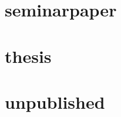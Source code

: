 \documentclass{article}
\begin{document}
\cite[1]{review}

\cite[1]{review}

\section{seminarpaper}

\cite[1]{seminarpaper}

\cite[1]{seminarpaper}

\section{thesis}

\cite[1]{thesis}

\cite[1]{thesis}

\section{unpublished}

\cite[1]{unpublished}

\cite[1]{unpublished}


\printbibliography
\end{document}
